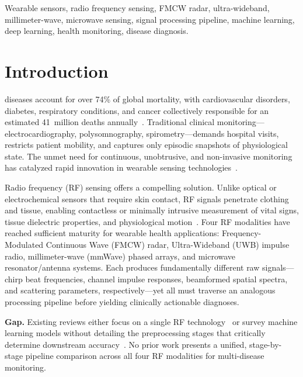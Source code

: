 \documentclass[journal,twoside]{IEEEtran}
\begin{document}
\begin{IEEEkeywords}
Wearable sensors, radio frequency sensing, FMCW radar, ultra-wideband, millimeter-wave, microwave sensing, signal processing pipeline, machine learning, deep learning, health monitoring, disease diagnosis.
\end{IEEEkeywords}

\section{Introduction}

 diseases account for over 74\% of global mortality, with cardiovascular disorders, diabetes, respiratory conditions, and cancer collectively responsible for an estimated 41~million deaths annually~\cite{ref_who2024}. Traditional clinical monitoring---electrocardiography, polysomnography, spirometry---demands hospital visits, restricts patient mobility, and captures only episodic snapshots of physiological state. The unmet need for continuous, unobtrusive, and non-invasive monitoring has catalyzed rapid innovation in wearable sensing technologies~\cite{ref_wearable_cardio2025}.

Radio frequency (RF) sensing offers a compelling solution. Unlike optical or electrochemical sensors that require skin contact, RF signals penetrate clothing and tissue, enabling contactless or minimally intrusive measurement of vital signs, tissue dielectric properties, and physiological motion~\cite{ref_mlrf_sensing2025}. Four RF modalities have reached sufficient maturity for wearable health applications: Frequency-Modulated Continuous Wave (FMCW) radar, Ultra-Wideband (UWB) impulse radio, millimeter-wave (mmWave) phased arrays, and microwave resonator/antenna systems. Each produces fundamentally different raw signals---chirp beat frequencies, channel impulse responses, beamformed spatial spectra, and scattering parameters, respectively---yet all must traverse an analogous processing pipeline before yielding clinically actionable diagnoses.

\textbf{Gap.} Existing reviews either focus on a single RF technology~\cite{ref_uwb_overview2024, ref_mmwave_ml_review2023} or survey machine learning models without detailing the preprocessing stages that critically determine downstream accuracy~\cite{ref_wearable_bp_ml2025}. No prior work presents a unified, stage-by-stage pipeline comparison across all four RF modalities for multi-disease monitoring.
\end{document}
